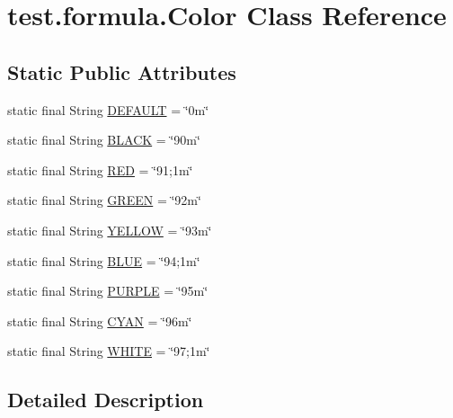 \hypertarget{classtest_1_1formula_1_1_color}{}\section{test.\+formula.\+Color Class Reference}
\label{classtest_1_1formula_1_1_color}
\subsection*{Static Public Attributes}
\begin{DoxyCompactItemize}
\item 
static final String \hyperlink{classtest_1_1formula_1_1_color_ac27ae5dedb3ac58be818cbfdb373e183}{D\+E\+F\+A\+U\+L\+T} = \char`\"{}0m\char`\"{}
\item 
static final String \hyperlink{classtest_1_1formula_1_1_color_a2722658400f511721eb2638360ffe63d}{B\+L\+A\+C\+K} = \char`\"{}90m\char`\"{}
\item 
static final String \hyperlink{classtest_1_1formula_1_1_color_a0c3138b80e11d35744f6ab13c82edff3}{R\+E\+D} = \char`\"{}91;1m\char`\"{}
\item 
static final String \hyperlink{classtest_1_1formula_1_1_color_a636d367365497327f443612fc5ee808c}{G\+R\+E\+E\+N} = \char`\"{}92m\char`\"{}
\item 
static final String \hyperlink{classtest_1_1formula_1_1_color_a640c4fecc1498ef9aa2ebf43b5aefb8e}{Y\+E\+L\+L\+O\+W} = \char`\"{}93m\char`\"{}
\item 
static final String \hyperlink{classtest_1_1formula_1_1_color_a5832cda89572843305e1863efef48f05}{B\+L\+U\+E} = \char`\"{}94;1m\char`\"{}
\item 
static final String \hyperlink{classtest_1_1formula_1_1_color_ad6dd9400e3c4f1b01e8a581db4523438}{P\+U\+R\+P\+L\+E} = \char`\"{}95m\char`\"{}
\item 
static final String \hyperlink{classtest_1_1formula_1_1_color_ab207902cb19e9e12368f8fb57b9ae0d7}{C\+Y\+A\+N} = \char`\"{}96m\char`\"{}
\item 
static final String \hyperlink{classtest_1_1formula_1_1_color_a8154969ea2b235189b18cc4844eeb14d}{W\+H\+I\+T\+E} = \char`\"{}97;1m\char`\"{}
\end{DoxyCompactItemize}


\subsection{Detailed Description}


